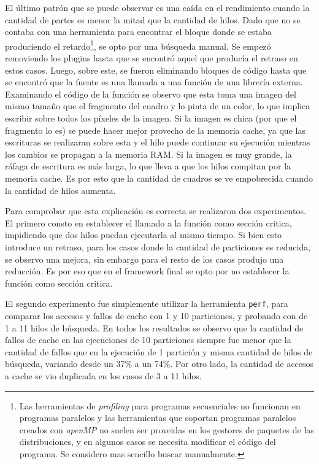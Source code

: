 El último patrón que se puede observar es una caída en el rendimiento cuando la
cantidad de partes es menor la mitad que la cantidad de hilos. Dado que no se
contaba con una herramienta para encontrar el bloque donde se estaba produciendo
el retardo\footnote{Las herramientas de \emph{profiling} para programas
secuenciales no funcionan en programas paralelos y las herramientas que soportan
programas paralelos creados con \emph{openMP} no suelen ser proveidas en los
gestores de paquetes de las distribuciones, y en algunos casos se necesita
modificar el código del programa. Se considero mas sencillo buscar
manualmente.}, se opto por una búsqueda manual. Se empezó removiendo los
plugins hasta que se encontró aquel que producía el retraso en estos casos.
Luego, sobre este, se fueron eliminando bloques de código hasta que se encontró
que la fuente es una llamada a una función de una librería externa. Examinando
el código de la función se observo que esta toma una imagen del mismo tamaño que
el fragmento del cuadro y lo pinta de un color, lo que implica escribir sobre
todos los píxeles de la imagen. Si la imagen es chica (por que el fragmento lo
es) se puede hacer mejor provecho de la memoria cache, ya que las escrituras se
realizaran sobre esta y el hilo puede continuar su ejecución mientras los
cambios se propagan a la memoria RAM. Si la imagen es muy grande, la ráfaga de
escritura es más larga, lo que lleva a que los hilos compitan por la memoria
cache. Es por esto que la cantidad de cuadros se ve empobrecida cuando la
cantidad de hilos aumenta.

Para comprobar que esta explicación es correcta se realizaron dos experimentos.
El primero consto en establecer el llamado a la función como sección critica,
impidiendo que dos hilos puedan ejecutarla al mismo tiempo. Si bien esto
introduce un retraso, para los casos donde la cantidad de particiones es
reducida, se observo una mejora, sin embargo para el resto de los casos produjo
una reducción. Es por eso que en el framework final se opto por no
establecer la función como sección critica.

El segundo experimento fue simplemente utilizar la herramienta \texttt{perf},
para comparar los accesos y fallos de cache con 1 y 10 particiones, y probando
con de 1 a 11 hilos de búsqueda. En todos los resultados se observo que la
cantidad de fallos de cache en las ejecuciones de 10 particiones siempre fue
menor que la cantidad de fallos que en la ejecución de 1 partición y misma
cantidad de hilos de búsqueda, variando desde un 37\% a un 74\%. Por otro lado,
la cantidad de accesos a cache se vio duplicada en los casos de 3 a 11 hilos.

